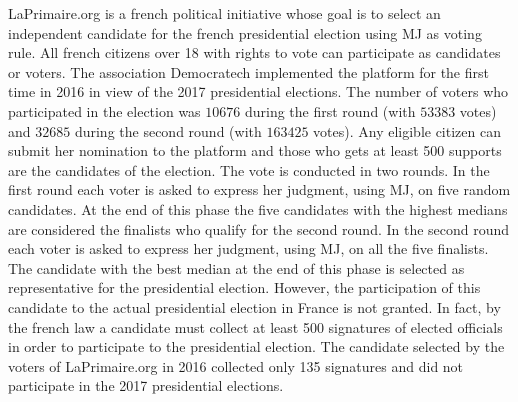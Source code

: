 LaPrimaire.org \citep{LaPrimaire} is a french political initiative whose goal is to select an independent candidate for the french presidential election using \ac{MJ} as voting rule. All french citizens over 18 with rights to vote can participate as candidates or voters. The association Democratech implemented the platform for the first time in 2016 in view of the 2017 presidential elections. The number of voters who participated in the election was $10676$ during the first round (with $53383$ votes) and $32685$ during the second round (with $163425$ votes).
Any eligible citizen can submit her nomination to the platform and those who gets at least 500 supports are the candidates of the election. The vote is conducted in two rounds.
In the first round each voter is asked to express her judgment, using \ac{MJ}, on five random candidates. At the end of this phase the five candidates with the highest medians are considered the finalists who qualify for the second round. In the second round each voter is asked to express her judgment, using \ac{MJ}, on all the five finalists. The candidate with the best median at the end of this phase is selected as representative for the presidential election.
However, the participation of this candidate to the actual presidential election in France is not granted. In fact, by the french law a candidate must collect at least 500 signatures of elected officials in order to participate to the presidential election. The candidate selected by the voters of LaPrimaire.org in 2016 collected only 135 signatures and did not participate in the 2017 presidential elections.  

